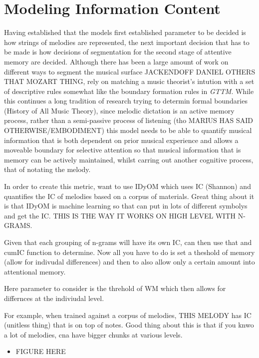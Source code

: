 \documentclass[]{book}
\providecommand{\tightlist}{%
  \setlength{\itemsep}{0pt}\setlength{\parskip}{0pt}}
\theoremstyle{definition}
\theoremstyle{definition}
\theoremstyle{definition}
\theoremstyle{remark}
\begin{document}
\hypertarget{modeling-information-content}{%
\section{Modeling Information
Content}\label{modeling-information-content}}

Having established that the models first established parameter to be
decided is how strings of melodies are represented, the next important
decision that has to be made is how decisions of segmentation for the
second stage of attentive memory are decided. Although there has been a
large amount of work on different ways to segment the musical surface
JACKENDOFF DANIEL OTHERS THAT MOZART THING, rely on matching a music
theorist's intution with a set of descriptive rules somewhat like the
boundary formation rules in \emph{GTTM}. While this continues a long
tradition of research trying to determin formal boundaries (History of
All Music Theory), since melodic dictation is an active memory process,
rather than a semi-passive process of listening (tho MARIUS HAS SAID
OTHERWISE/EMBODIMENT) this model needs to be able to quantify musical
information that is both dependent on prior musical experience and
allows a moveable boundary for selective attention so that musical
information that is memory can be actively maintained, whilst carring
out another cognitive process, that of notating the melody.

In order to create this metric, want to use IDyOM which uses IC
(Shannon) and quantifies the IC of melodies based on a corpus of
materials. Great thing about it is that IDyOM is machine learning so
that can put in lots of different symbolys and get the IC. THIS IS THE
WAY IT WORKS ON HIGH LEVEL WITH N-GRAMS.

Given that each grouping of n-grams will have its own IC, can then use
that and cumIC function to determine. Now all you have to do is set a
theshold of memory (allow for indivudal differences) and then to also
allow only a certain amount into attentional memory.

Here parameter to consider is the threhold of WM which then allows for
differnces at the indiviudal level.

For example, when trained against a corpus of melodies, THIS MELODY has
IC (unitless thing) that is on top of notes. Good thing about this is
that if you knwo a lot of melodies, cna have bigger chunks at various
levels.

\begin{itemize}
\tightlist
\item
  FIGURE HERE
\end{itemize}
\end{document}
